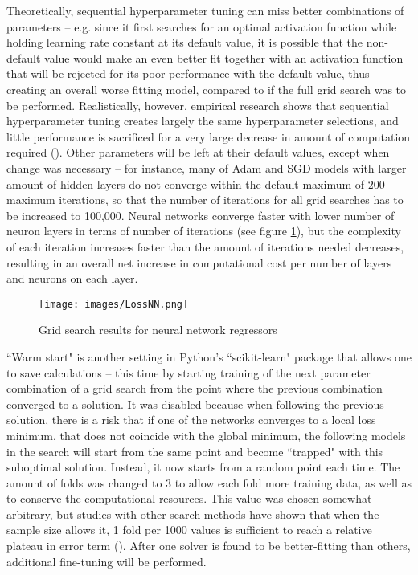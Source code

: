 \documentclass[12pt]{report}
\begin{document}
Theoretically, sequential hyperparameter tuning can miss better combinations of parameters -- e.g. since it first searches for an optimal activation function while holding learning rate constant at its default value, it is possible that the non-default value would make an even better fit together with an activation function that will be rejected for its poor performance with the default value, thus creating an overall worse fitting model, compared to if the full grid search was to be performed. Realistically, however, empirical research shows that sequential hyperparameter tuning creates largely the same hyperparameter selections, and little performance is sacrificed for a very large decrease in amount of computation required (\cite{jin2022}). Other parameters will be left at their default values, except when change was necessary -- for instance, many of Adam and SGD models with larger amount of hidden layers do not converge within the default maximum of 200 maximum iterations, so that the number of iterations for all grid searches has to be increased to 100,000. Neural networks converge faster with lower number of neuron layers in terms of number of iterations (see figure \ref{fig:nnloss}), but the complexity of each iteration increases faster than the amount of iterations needed decreases, resulting in an overall net increase in computational cost per number of layers and neurons on each layer.

\begin{figure}[ht]
	\centering
	\texttt{[image: images/LossNN.png]}
	\caption{Grid search results for neural network regressors}
	\label{fig:nnloss}
\end{figure}

``Warm start" is another setting in Python's ``scikit-learn" package that allows one to save calculations -- this time by starting training of the next parameter combination of a grid search from the point where the previous combination converged to a solution. It was disabled because when following the previous solution, there is a risk that if one of the networks converges to a local loss minimum, that does not coincide with the global minimum, the following models in the search will start from the same point and become ``trapped" with this suboptimal solution. Instead, it now starts from a random point each time. The amount of folds was changed to 3 to allow each fold more training data, as well as to conserve the computational resources. This value was chosen somewhat arbitrary, but studies with other search methods have shown that when the sample size allows it, 1 fold per 1000 values is sufficient to reach a relative plateau in error term (\cite{marcot2021}). After one solver is found to be better-fitting than others, additional fine-tuning will be performed.
\end{document}

